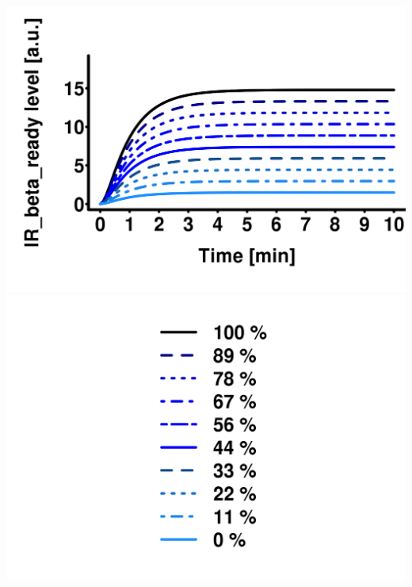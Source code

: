 \documentclass[10pt,a4paper]{article}
\begin{document}
\includegraphics[scale=0.08]{plots_det_tc_parameter_scan/insulin_receptor_scan_IR_beta__eval_IR_beta_ready__sim_1.png}
\hfill
\includegraphics[scale=0.08]{plots_det_tc_parameter_scan/param_scan__single_perturb_legend.png}
\hfill
\end{document}
